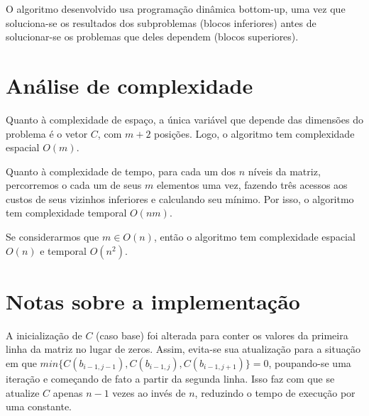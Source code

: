 \documentclass[12pt,a4paper]{article}
\begin{document}
  O algoritmo desenvolvido usa programação dinâmica bottom-up, uma vez que soluciona-se os resultados dos subproblemas (blocos inferiores) antes de solucionar-se os problemas que deles dependem (blocos superiores).

  \section{Análise de complexidade}
  Quanto à complexidade de espaço, a única variável que depende das dimensões do problema é o vetor $C$, com $m+2$ posições. Logo, o algoritmo tem complexidade espacial $O(m)$.

  Quanto à complexidade de tempo, para cada um dos $n$ níveis da matriz, percorremos o cada um de seus $m$ elementos uma vez, fazendo três acessos aos custos de seus vizinhos inferiores e calculando seu mínimo. Por isso, o algoritmo tem complexidade temporal $O(nm)$.

  Se considerarmos que $m \in O(n)$, então o algoritmo tem complexidade espacial $O(n)$ e temporal $O(n^2)$.

  \section{Notas sobre a implementação}
  A inicialização de $C$ (caso base) foi alterada para conter os valores da primeira linha da matriz no lugar de zeros. Assim, evita-se sua atualização para a situação em que $min\{C(b_{i-1,j-1}),C(b_{i-1,j}),C(b_{i-1,j+1})\} = 0$, poupando-se uma iteração e começando de fato a partir da segunda linha. Isso faz com que se atualize $C$ apenas $n-1$ vezes ao invés de $n$, reduzindo o tempo de execução por uma constante.
\end{document}
